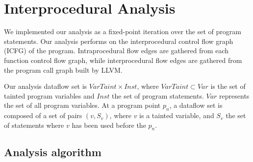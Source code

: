 \section{Interprocedural Analysis}\label{analysis}

We implemented our analysis as a fixed-point iteration
over the set of program statements. Our analysis performs
on the interprocedural control flow graph (ICFG) of the program.
Intraprocedural flow edges are gathered from each function
control flow graph, while interprocedural flow edges are
gathered from the program call graph built by LLVM. 

Our analysis dataflow set is $VarTaint \times Inst$,
where $VarTaint \subset Var$ is the set of tainted program
variables and $Inst$ the set of program statements. 
$Var$ represents the set of all program variables.
At a program point $p_n$, a dataflow set is composed
of a set of pairs $(v, S_v)$, where $v$ is a tainted
variable, and $S_v$ the set of statements where $v$
has been used before the $p_n$.
 
\subsection{Analysis algorithm} 

